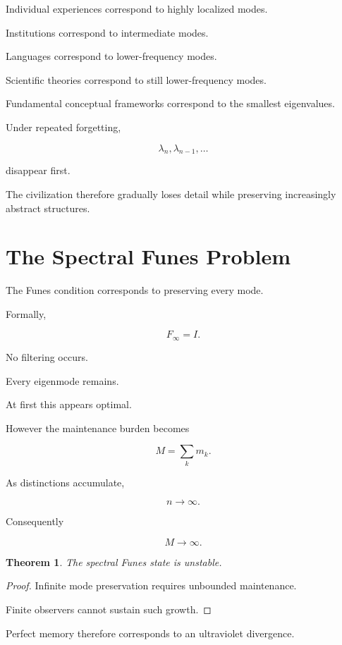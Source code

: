 \documentclass[12pt,oneside]{book}
\theoremstyle{plain} \newtheorem{theorem}{Theorem}[chapter] \newtheorem{lemma}[theorem]{Lemma} \newtheorem{proposition}[theorem]{Proposition} \newtheorem{corollary}[theorem]{Corollary}
\theoremstyle{definition} \newtheorem{definition}[theorem]{Definition} \newtheorem{axiom}[theorem]{Axiom} \newtheorem{construction}[theorem]{Construction}
\theoremstyle{remark} \newtheorem{remark}[theorem]{Remark} \newtheorem{example}[theorem]{Example}
\begin{document}
Individual experiences correspond to highly localized modes.

Institutions correspond to intermediate modes.

Languages correspond to lower-frequency modes.

Scientific theories correspond to still lower-frequency modes.

Fundamental conceptual frameworks correspond to the smallest eigenvalues.

Under repeated forgetting,

\[
\lambda_n,
\lambda_{n-1},
\ldots
\]

disappear first.

The civilization therefore gradually loses detail while preserving increasingly abstract structures.

\section{The Spectral Funes Problem}

The Funes condition corresponds to preserving every mode.

Formally,

\[
F_{\infty}
=
I.
\]

No filtering occurs.

Every eigenmode remains.

At first this appears optimal.

However the maintenance burden becomes

\[
M
=
\sum_k
m_k.
\]

As distinctions accumulate,

\[
n
\rightarrow
\infty.
\]

Consequently

\[
M
\rightarrow
\infty.
\]

\begin{theorem}

The spectral Funes state is unstable.

\end{theorem}

\begin{proof}

Infinite mode preservation requires unbounded maintenance.

Finite observers cannot sustain such growth.

\end{proof}

Perfect memory therefore corresponds to an ultraviolet divergence.
\end{document}
